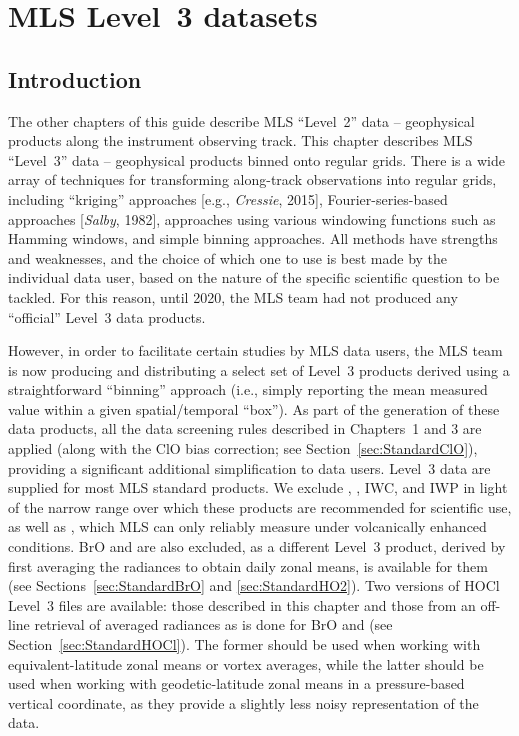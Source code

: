 \chapter{MLS Level~3 datasets}
\label{chap:Level3}

\section{Introduction}
\label{sec:L3Intro}

The other chapters of this guide describe MLS ``Level~2'' data -- geophysical products along the instrument observing track. This chapter describes MLS ``Level~3'' data -- geophysical products binned onto regular grids. There is a wide array of techniques for transforming along-track observations into regular grids, including ``kriging'' approaches {[}e.g., \emph{Cressie}, 2015{]}, Fourier-series-based approaches {[}\emph{Salby}, 1982{]}, approaches using various windowing functions such as Hamming windows, and simple binning approaches. All methods have strengths and weaknesses, and the choice of which one to use is best made by the individual data user, based on the nature of the specific scientific question to be tackled. For this reason, until 2020, the MLS team had not produced any ``official'' Level~3 data products.

However, in order to facilitate certain studies by MLS data users, the MLS team is now producing and distributing a select set of Level~3 products derived using a straightforward ``binning'' approach (i.e., simply reporting the mean measured value within a given spatial/temporal ``box''). As part of the generation of these data products, all the data screening rules described in Chapters~1 and 3 are applied (along with the ClO bias correction; see Section~\ref{sec:StandardClO}), providing a significant additional simplification to data users. Level~3 data are supplied for most MLS standard products. We exclude , , IWC, and IWP in light of the narrow range over which these products are recommended for scientific use, as well as , which MLS can only reliably measure under volcanically enhanced conditions. BrO and  are also excluded, as a different Level~3 product, derived by first averaging the radiances to obtain daily zonal means, is available for them (see Sections~\ref{sec:StandardBrO} and \ref{sec:StandardHO2}). Two versions of HOCl Level~3 files are available: those described in this chapter and those from an off-line retrieval of averaged radiances as is done for BrO and  (see Section~\ref{sec:StandardHOCl}). The former should be used when working with equivalent-latitude zonal means or vortex averages, while the latter should be used when working with geodetic-latitude zonal means in a pressure-based vertical coordinate, as they provide a slightly less noisy representation of the data.

